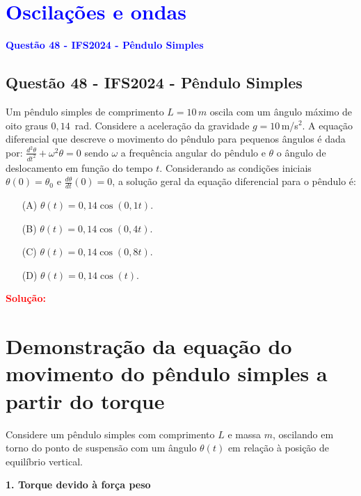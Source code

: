 \section{\large \textcolor{blue}{Oscilações e ondas}}

\begin{flushleft}
\textbf{\textcolor{blue}{\Large Quest\~ao 48 - IFS2024 - P\^endulo Simples}}\\
\noindent
\subsection{Quest\~ao 48 - IFS2024 - P\^endulo Simples}
Um pêndulo simples de comprimento \( L = 10\,m \) oscila com um ângulo máximo de oito graus \( 0{,}14\,\) rad.  
Considere a aceleração da gravidade \( g = 10\,\)m/s\(^2\). A equação diferencial que descreve o movimento do pêndulo para pequenos ângulos é dada por:
$\frac{d^2\theta}{dt^2} + \omega^2 \theta = 0$ sendo \( \omega \) a frequência angular do pêndulo e \( \theta \) o ângulo de deslocamento em função do tempo \( t \).  
Considerando as condições iniciais \( \theta(0) = \theta_0 \) e \( \frac{d\theta}{dt}(0) = 0 \), a solução geral da equação diferencial para o pêndulo é:

\begin{itemize}
\item[(A)] \( \theta(t) = 0{,}14\cos(0{,}1t) \).
\item[(B)] \( \theta(t) = 0{,}14\cos(0{,}4t) \).
\item[(C)] \( \theta(t) = 0{,}14\cos(0{,}8t) \).
\item[(D)] \( \theta(t) = 0{,}14\cos(t) \).
\end{itemize}

\vspace{0.5cm}

\textcolor{red}{\textbf{Solução:}}\\

\section*{Demonstração da equação do movimento do pêndulo simples a partir do torque}

Considere um pêndulo simples com comprimento \(L\) e massa \(m\), oscilando em torno do ponto de suspensão com um ângulo \(\theta(t)\) em relação à posição de equilíbrio vertical.

\bigskip

\textbf{1. Torque devido à força peso}


\end{flushleft}
